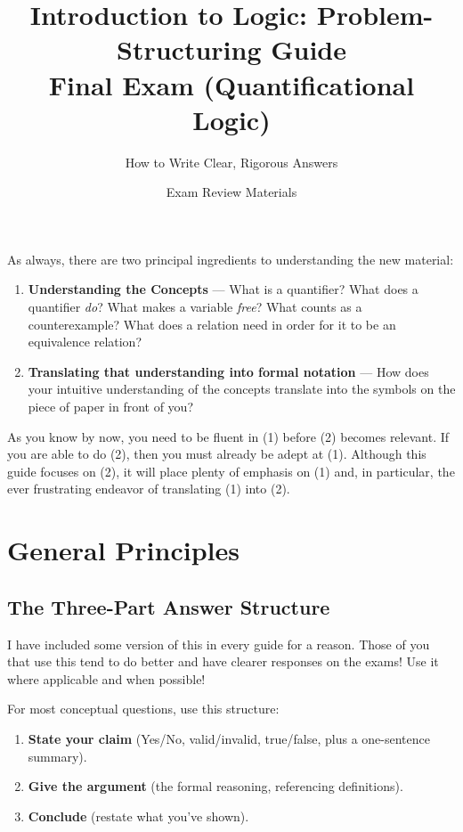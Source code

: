 \documentclass[11pt]{article}
\title{Introduction to Logic: Problem-Structuring Guide\\Final Exam (Quantificational Logic)}
\author{How to Write Clear, Rigorous Answers}
\date{Exam Review Materials}
\begin{document}
\maketitle

\begin{tcolorbox}[colback=boxgray, colframe=black!50, title={Key philosophy}]
As always, there are two principal ingredients to understanding the new material:
\begin{enumerate}
    \item \textbf{Understanding the Concepts} --- What is a quantifier? What does a quantifier \textit{do}? What makes a variable \textit{free}? What counts as a counterexample? What does a relation need in order for it to be an equivalence relation?
    \item \textbf{Translating that understanding into formal notation} --- How does your intuitive understanding of the concepts translate into the symbols on the piece of paper in front of you?
\end{enumerate}

As you know by now, you need to be fluent in (1) before (2) becomes relevant. If you are able to do (2), then you must already be adept at (1). Although this guide focuses on (2), it will place plenty of emphasis on (1) and, in particular, the ever frustrating endeavor of translating (1) into (2).
\end{tcolorbox}

\tableofcontents

\newpage

\section{General Principles}

\subsection{The Three-Part Answer Structure}
I have included some version of this in every guide for a reason. Those of you that use this tend to do better and have clearer responses on the exams! Use it where applicable and when possible!

For most conceptual questions, use this structure:

\begin{template}
\begin{enumerate}
    \item \textbf{State your claim} (Yes/No, valid/invalid, true/false, plus a one-sentence summary).
    \item \textbf{Give the argument} (the formal reasoning, referencing definitions).
    \item \textbf{Conclude} (restate what you've shown).
\end{enumerate}
\end{template}
\end{document}
